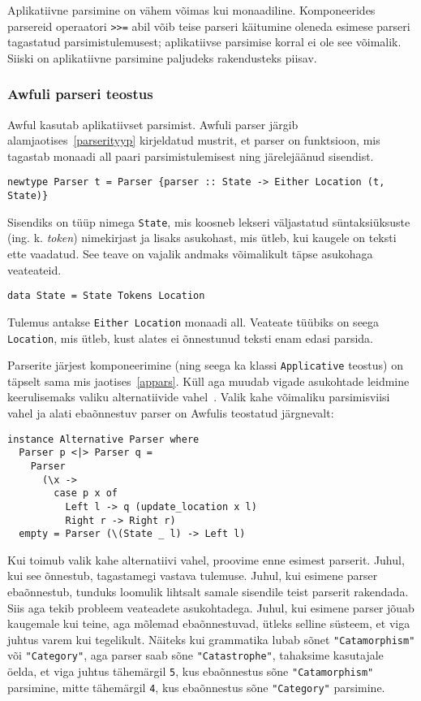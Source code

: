 \documentclass[12pt]{article}
\begin{document}
        Aplikatiivne parsimine on vähem võimas kui monaadiline. Komponeerides parsereid operaatori \verb!>>=! abil võib teise parseri käitumine oleneda esimese parseri tagastatud parsimistulemusest; aplikatiivse parsimise korral ei ole see võimalik. Siiski on aplikatiivne parsimine paljudeks rakendusteks piisav.
      \subsubsection{Awfuli parseri teostus}
        Awful kasutab aplikatiivset parsimist. Awfuli parser järgib alamjaotises~\ref{parserityyp} kirjeldatud mustrit, et parser on funktsioon, mis tagastab monaadi all paari parsimistulemisest ning järelejäänud sisendist.

        \begin{verbatim}newtype Parser t = Parser {parser :: State -> Either Location (t, State)}\end{verbatim}

        Sisendiks on tüüp nimega \verb!State!, mis koosneb lekseri väljastatud süntaksiüksuste (ing. k. \textit{token}) nimekirjast ja lisaks asukohast, mis ütleb, kui kaugele on teksti ette vaadatud. See teave on vajalik andmaks võimalikult täpse asukohaga veateateid.

        \begin{verbatim}data State = State Tokens Location\end{verbatim}

        Tulemus antakse \verb!Either Location! monaadi all. Veateate tüübiks on seega \verb!Location!, mis ütleb, kust alates ei õnnestunud teksti enam edasi parsida.

        Parserite järjest komponeerimine (ning seega ka klassi \verb!Applicative! teostus) on täpselt sama mis jaotises~\ref{appars}. Küll aga muudab vigade asukohtade leidmine keerulisemaks valiku alternatiivide vahel~\cite{Err}. Valik kahe võimaliku parsimisviisi vahel ja alati ebaõnnestuv parser on Awfulis teostatud järgnevalt:

        \begin{verbatim}instance Alternative Parser where
  Parser p <|> Parser q =
    Parser
      (\x ->
        case p x of
          Left l -> q (update_location x l)
          Right r -> Right r)
  empty = Parser (\(State _ l) -> Left l)\end{verbatim}

        Kui toimub valik kahe alternatiivi vahel, proovime enne esimest parserit. Juhul, kui see õnnestub, tagastamegi vastava tulemuse. Juhul, kui esimene parser ebaõnnestub, tunduks loomulik lihtsalt samale sisendile teist parserit rakendada. Siis aga tekib probleem veateadete asukohtadega. Juhul, kui esimene parser jõuab kaugemale kui teine, aga mõlemad ebaõnnestuvad, ütleks selline süsteem, et viga juhtus varem kui tegelikult. Näiteks kui grammatika lubab sõnet \verb!"Catamorphism"! või \verb!"Category"!, aga parser saab sõne \verb!"Catastrophe"!, tahaksime kasutajale öelda, et viga juhtus tähemärgil \verb!5!, kus ebaõnnestus sõne \verb!"Catamorphism"! parsimine, mitte tähemärgil \verb!4!, kus ebaõnnestus sõne \verb!"Category"! parsimine.
\end{document}
